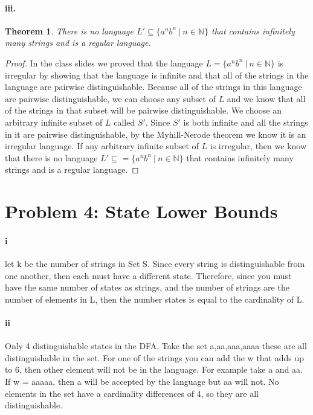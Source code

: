 \documentclass[10pt,letter]{article}
\newtheorem*{thm}{Theorem}
\begin{document}
\paragraph{iii.}
\begin{thm} There is no language $L' \subseteq  \{a^nb^n \ | \ n \in \mathbb{N} \}$ that contains infinitely many strings and is a regular language. \end{thm}
\begin{proof}
In the class slides we proved that the language $L = \{a^nb^n \ | \ n \in \mathbb{N} \}$ is irregular by showing that the language is infinite and that all of the strings in the language are pairwise distinguishable. Because all of the strings in this language are pairwise distinguishable, we can choose any subset of $L$ and we know that all of the strings in that subset will be pairwise distinguishable. We choose an arbitrary infinite subset of $L$ called $S'$. Since $S'$ is both infinite and all the strings in it are pairwise distinguishable, by the Myhill-Nerode theorem we know it is an irregular language. If any arbitrary infinite subset of $L$ is irregular, then we know that there is no language $L' \subseteq  = \{a^nb^n \ | \ n \in \mathbb{N} \}$ that contains infinitely many strings and is a regular language.
\end{proof}

\section*{Problem 4: State Lower Bounds}
\paragraph{i}
let k be the number of strings in Set S. Since every string is distinguishable from one another, then each must have a different state. Therefore, since you must have the same number of states as strings, and the number of strings are the number of elements in L, then the number states is equal to the cardinality of L. 

\paragraph{ii}
Only 4 distinguishable states in the DFA. Take the set {a,aa,aaa,aaaa} these are all distinguishable in the set. For one of the strings you can add the w that adds up to 6, then other element will not be in the language. For example take a and aa. If w = aaaaa, then a will be accepted by the language but aa will not. No elements in the set have a cardinality differences of 4, so they are all distinguishable. 
\end{document}
